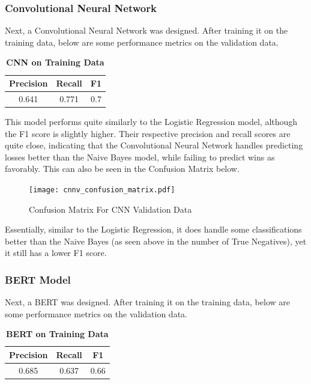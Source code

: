 \documentclass[twocolumn]{article}
\begin{document}
\subsubsection{Convolutional Neural Network}
Next, a Convolutional Neural Network was designed. After training it on the training data, below are some performance metrics on the validation data. 

\begin{table}[H]
\centering %
\caption{\textbf{CNN on Training Data}} 

\begin{tabular}{ccc} 
\toprule
Precision & Recall & F1 \\ 
\midrule
0.641 & 0.771 & 0.7 \\
\bottomrule
\end{tabular}
\end{table}

This model performs quite similarly to the Logistic Regression model, although the F1 score is slightly higher. Their respective precision and recall scores are quite close, indicating that the Convolutional Neural Network handles predicting losses better than the Naive Bayes model, while failing to predict wins as favorably. This can also be seen in the Confusion Matrix below.

\begin{figure}[H]
    \centering
    \texttt{[image: cnnv\_confusion\_matrix.pdf]}
    \caption{Confusion Matrix For CNN Validation Data}
\end{figure}

Essentially, similar to the Logistic Regression, it does handle some classifications better than the Naive Bayes (as seen above in the number of True Negatives), yet it still has a lower F1 score.

\subsubsection{BERT Model}

Next, a BERT was designed. After training it on the training data, below are some performance metrics on the validation data.

\begin{table}[H]
\centering %
\caption{\textbf{BERT on Training Data}} 

\begin{tabular}{ccc} 
\toprule
Precision & Recall & F1 \\ 
\midrule
0.685 & 0.637 & 0.66 \\
\bottomrule
\end{tabular}
\end{table}
\end{document}
